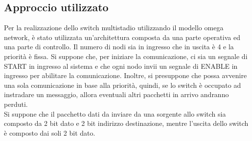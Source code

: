 \documentclass[12pt]{article}
\begin{document}
\subsection{Approccio utilizzato}
Per la realizzazione dello switch multistadio utilizzando il modello omega network, è stato utilizzata un’architettura composta da una parte operativa ed una parte di controllo. Il numero di nodi sia in ingresso che in uscita è 4 e la priorità è fissa. Si suppone che, per iniziare la comunicazione, ci sia un segnale di START in ingresso al sistema e che ogni nodo invii un segnale di ENABLE in ingresso per abilitare la comunicazione. Inoltre, si presuppone che possa avvenire una sola comunicazione in base alla priorità, quindi, se lo switch è occupato ad instradare un messaggio, allora eventuali altri pacchetti in arrivo andranno perduti. 
\\Si suppone che il pacchetto dati da inviare da una sorgente allo switch sia composto da 2 bit dato e 2 bit indirizzo destinazione, mentre l’uscita dello switch è composto dai soli 2 bit dato.
\clearpage
\end{document}
